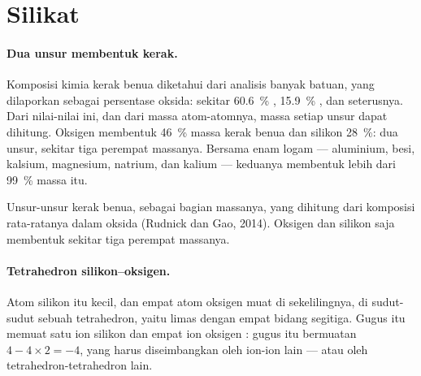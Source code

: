 \section{Silikat}

\paragraph{Dua unsur membentuk kerak.} Komposisi kimia kerak benua diketahui dari
analisis banyak batuan, yang dilaporkan sebagai persentase oksida: sekitar
\qty{60.6}{\percent} , \qty{15.9}{\percent} , dan seterusnya.
Dari nilai-nilai ini, dan dari massa atom-atomnya, massa setiap unsur dapat
dihitung. Oksigen membentuk \qty{46}{\percent} massa kerak benua dan silikon
\qty{28}{\percent}: dua unsur, sekitar tiga perempat massanya. Bersama enam logam
--- aluminium, besi, kalsium, magnesium, natrium, dan kalium --- keduanya
membentuk lebih dari \qty{99}{\percent} massa itu.

\begin{omfigure}

{\small Unsur-unsur kerak benua, sebagai bagian massanya, yang dihitung dari
komposisi rata-ratanya dalam oksida (Rudnick dan Gao, 2014). Oksigen dan silikon
saja membentuk sekitar tiga perempat massanya.}
\end{omfigure}

\paragraph{Tetrahedron silikon--oksigen.} Atom silikon itu kecil, dan empat atom
oksigen muat di sekelilingnya, di sudut-sudut sebuah tetrahedron, yaitu limas
dengan empat bidang segitiga. Gugus itu memuat satu ion silikon  dan
empat ion oksigen : gugus itu bermuatan $4 - 4 \times 2 = -4$, yang
harus diseimbangkan oleh ion-ion lain --- atau oleh tetrahedron-tetrahedron lain.


